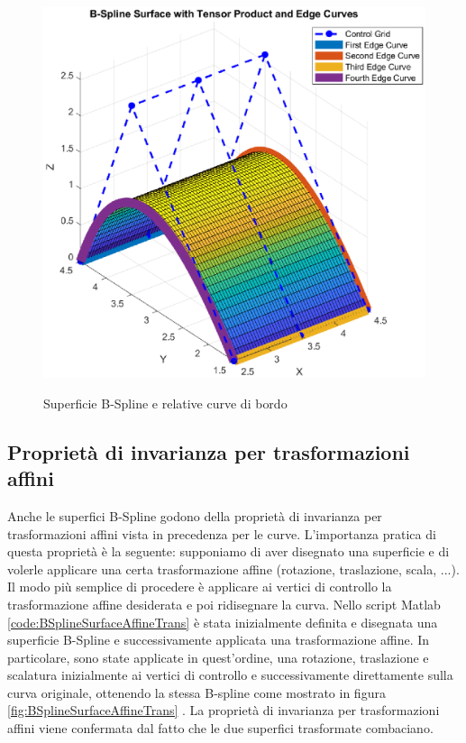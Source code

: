 \documentclass[a4paper, 12pt]{article}
\begin{document}
\begin{figure}[h!]
	\centering
	\caption{Superficie B-Spline e relative curve di bordo}
	\includegraphics[scale=0.55]{surface_tensor_product_plot.eps}
	\label{fig:BSpline_Surface}
\end{figure}

\subsection{Proprietà di invarianza per trasformazioni affini}
Anche le superfici B-Spline godono della proprietà di invarianza per trasformazioni affini vista in precedenza per le curve. L’importanza pratica di questa proprietà è la seguente: supponiamo di aver disegnato una superficie e di volerle
applicare una certa trasformazione affine (rotazione, traslazione, scala, ...). Il modo più semplice di procedere è 
applicare ai vertici di controllo la trasformazione affine desiderata e poi ridisegnare la curva.
Nello script Matlab \ref{code:BSplineSurfaceAffineTrans} è stata inizialmente definita e disegnata una superficie B-Spline e successivamente applicata una trasformazione affine. In particolare, sono state applicate in quest'ordine, una rotazione, traslazione e scalatura inizialmente ai vertici di controllo e successivamente direttamente sulla curva originale, ottenendo la stessa B-spline come mostrato in figura \ref{fig:BSplineSurfaceAffineTrans} .
La proprietà di invarianza per trasformazioni affini viene confermata dal fatto che le due superfici trasformate combaciano.
\end{document}
